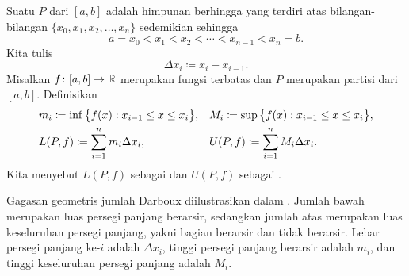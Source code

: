 \begin{defn}
Suatu \emph{} $P$ dari $[a,b]$ adalah
himpunan berhingga yang terdiri atas bilangan-bilangan $\{ x_0,x_1,x_2,\ldots,x_n \}$ sedemikian sehingga
\begin{equation*}
a = x_0 < x_1 < x_2 < \cdots < x_{n-1} < x_n = b .
\end{equation*}
Kita tulis
\begin{equation*}
\Delta x_i \coloneqq x_i - x_{i-1} .
\end{equation*}
Misalkan $f \colon [a,b] \to {\mathbb{R}}$ merupakan fungsi terbatas dan $P$ merupakan partisi dari
$[a,b]$.
Definisikan
\begin{align*}
& m_i \coloneqq \inf \, \bigl\{ f(x) : x_{i-1} \leq x \leq x_i \bigr\} , &
& M_i \coloneqq \sup \, \bigl\{ f(x) : x_{i-1} \leq x \leq x_i \bigr\} , \\
& L(P,f) \coloneqq
\sum_{i=1}^n m_i \Delta x_i , &
& U(P,f) \coloneqq
\sum_{i=1}^n M_i \Delta x_i .
\avoidbreak
\end{align*}
Kita menyebut $L(P,f)$ sebagai \emph{} dan
$U(P,f)$ sebagai \emph{}.
\end{defn}

Gagasan geometris jumlah Darboux diilustrasikan dalam
.  Jumlah bawah merupakan luas persegi panjang
berarsir, sedangkan jumlah atas merupakan luas keseluruhan persegi panjang,
yakni bagian berarsir dan tidak berarsir.  Lebar persegi panjang ke-$i$ adalah $\Delta x_i$,
tinggi persegi panjang berarsir adalah $m_i$, dan tinggi
keseluruhan persegi panjang adalah $M_i$.

\begin{myfigureht}
\caption{Contoh jumlah Darboux.\label{darbouxfig}}
\end{myfigureht}


